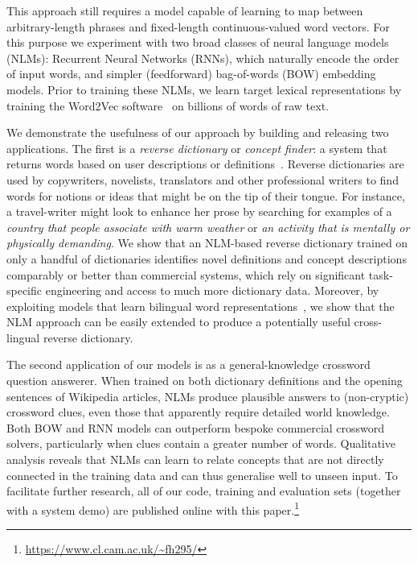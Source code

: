 \documentclass[11pt,letterpaper]{article}
\begin{document}
This approach still requires a model capable of learning to map between arbitrary-length phrases and fixed-length continuous-valued word vectors. For this purpose we experiment with two broad classes of neural language models (NLMs): Recurrent Neural Networks (RNNs), which naturally encode the order of input words, and simpler (feedforward) bag-of-words (BOW) embedding models. Prior to training these NLMs, we learn target lexical representations by training the Word2Vec software~\cite{mikolov2013distributed} on billions of words of raw text. 

We demonstrate the usefulness of our approach by building and releasing two applications. The first is a \emph{reverse dictionary} or \emph{concept finder}: a system that returns words based on user descriptions or definitions~\cite{zock2004word}. Reverse dictionaries are used by copywriters, novelists, translators and other professional writers to find words for notions or ideas that might be on the tip of their tongue. For instance, a travel-writer might look to enhance her prose by searching for examples of a \emph{country that people associate with warm weather} or \emph{an activity that is mentally or physically demanding}. We show that an NLM-based reverse dictionary trained on only a handful of dictionaries identifies novel definitions and concept descriptions comparably or better than commercial systems, which rely on significant task-specific engineering and access to much more dictionary data. Moreover, by exploiting models that learn bilingual word representations~\cite{307754,klementiev2012inducing,hermann2013multilingual,gouws2014bilbowa}, we show that the NLM approach can be easily extended to produce a potentially useful cross-lingual reverse dictionary.

The second application of our models is as a general-knowledge crossword question answerer. When trained on both dictionary definitions and the opening sentences of Wikipedia articles, NLMs produce plausible answers to (non-cryptic) crossword clues, even those that apparently require detailed world knowledge. Both BOW and RNN models can outperform bespoke commercial crossword solvers, particularly when clues contain a greater number of words. Qualitative analysis reveals that NLMs can learn to relate concepts that are not directly connected in the training data and can thus generalise well to unseen input. To facilitate further research, all of our code, training and evaluation sets (together with a system demo) are published online with this paper.\footnote{
    \url{https://www.cl.cam.ac.uk/~fh295/}
}
\end{document}

